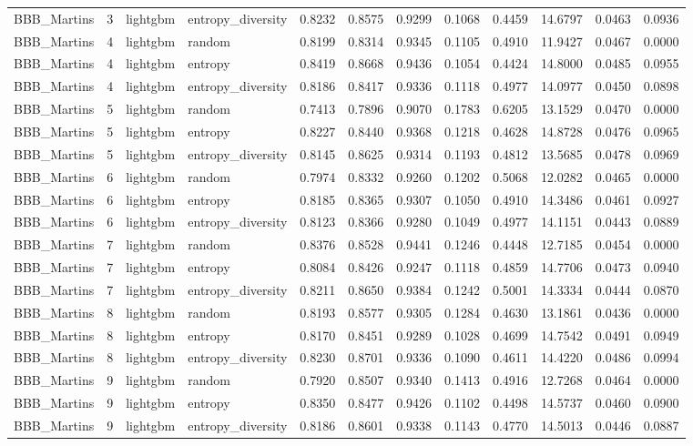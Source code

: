 \begin{tabular}{lrllrrrrrrrr}
BBB_Martins & 3 & lightgbm & entropy_diversity & 0.8232 & 0.8575 & 0.9299 & 0.1068 & 0.4459 & 14.6797 & 0.0463 & 0.0936 \\
BBB_Martins & 4 & lightgbm & random & 0.8199 & 0.8314 & 0.9345 & 0.1105 & 0.4910 & 11.9427 & 0.0467 & 0.0000 \\
BBB_Martins & 4 & lightgbm & entropy & 0.8419 & 0.8668 & 0.9436 & 0.1054 & 0.4424 & 14.8000 & 0.0485 & 0.0955 \\
BBB_Martins & 4 & lightgbm & entropy_diversity & 0.8186 & 0.8417 & 0.9336 & 0.1118 & 0.4977 & 14.0977 & 0.0450 & 0.0898 \\
BBB_Martins & 5 & lightgbm & random & 0.7413 & 0.7896 & 0.9070 & 0.1783 & 0.6205 & 13.1529 & 0.0470 & 0.0000 \\
BBB_Martins & 5 & lightgbm & entropy & 0.8227 & 0.8440 & 0.9368 & 0.1218 & 0.4628 & 14.8728 & 0.0476 & 0.0965 \\
BBB_Martins & 5 & lightgbm & entropy_diversity & 0.8145 & 0.8625 & 0.9314 & 0.1193 & 0.4812 & 13.5685 & 0.0478 & 0.0969 \\
BBB_Martins & 6 & lightgbm & random & 0.7974 & 0.8332 & 0.9260 & 0.1202 & 0.5068 & 12.0282 & 0.0465 & 0.0000 \\
BBB_Martins & 6 & lightgbm & entropy & 0.8185 & 0.8365 & 0.9307 & 0.1050 & 0.4910 & 14.3486 & 0.0461 & 0.0927 \\
BBB_Martins & 6 & lightgbm & entropy_diversity & 0.8123 & 0.8366 & 0.9280 & 0.1049 & 0.4977 & 14.1151 & 0.0443 & 0.0889 \\
BBB_Martins & 7 & lightgbm & random & 0.8376 & 0.8528 & 0.9441 & 0.1246 & 0.4448 & 12.7185 & 0.0454 & 0.0000 \\
BBB_Martins & 7 & lightgbm & entropy & 0.8084 & 0.8426 & 0.9247 & 0.1118 & 0.4859 & 14.7706 & 0.0473 & 0.0940 \\
BBB_Martins & 7 & lightgbm & entropy_diversity & 0.8211 & 0.8650 & 0.9384 & 0.1242 & 0.5001 & 14.3334 & 0.0444 & 0.0870 \\
BBB_Martins & 8 & lightgbm & random & 0.8193 & 0.8577 & 0.9305 & 0.1284 & 0.4630 & 13.1861 & 0.0436 & 0.0000 \\
BBB_Martins & 8 & lightgbm & entropy & 0.8170 & 0.8451 & 0.9289 & 0.1028 & 0.4699 & 14.7542 & 0.0491 & 0.0949 \\
BBB_Martins & 8 & lightgbm & entropy_diversity & 0.8230 & 0.8701 & 0.9336 & 0.1090 & 0.4611 & 14.4220 & 0.0486 & 0.0994 \\
BBB_Martins & 9 & lightgbm & random & 0.7920 & 0.8507 & 0.9340 & 0.1413 & 0.4916 & 12.7268 & 0.0464 & 0.0000 \\
BBB_Martins & 9 & lightgbm & entropy & 0.8350 & 0.8477 & 0.9426 & 0.1102 & 0.4498 & 14.5737 & 0.0460 & 0.0900 \\
BBB_Martins & 9 & lightgbm & entropy_diversity & 0.8186 & 0.8601 & 0.9338 & 0.1143 & 0.4770 & 14.5013 & 0.0446 & 0.0887 \\
\bottomrule
\end{tabular}
